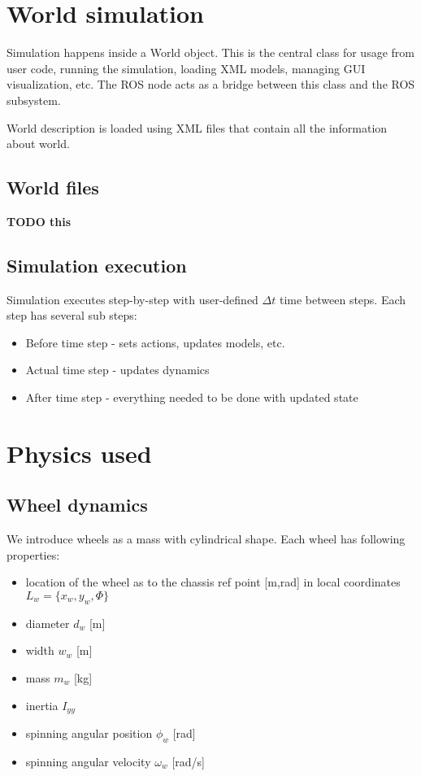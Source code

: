 \documentclass[a4paper,11pt]{article}
\begin{document}
\newpage

\section{World simulation}
Simulation happens inside a World object.
This is the central class for usage from user code, running the simulation, loading XML models, managing GUI visualization, etc.
The ROS node acts as a bridge between this class and the ROS subsystem.

World description is loaded using XML files that contain all the information about world.

\subsection{World files}
\textbf{TODO this}
\newpage


\subsection{Simulation execution}
Simulation executes step-by-step with user-defined $\Delta t$ time between steps.
Each step has several sub steps:
\begin{itemize}
\item Before time step - sets actions, updates models, etc.
\item Actual time step - updates dynamics
\item After time step - everything needed to be done with updated state
\end{itemize}
\newpage

\section{Physics used}
\subsection{Wheel dynamics}

We introduce wheels as a mass with cylindrical shape.
Each wheel has following properties:
\begin{itemize}
\item location of the wheel as to the chassis ref point [m,rad] in local coordinates $L_w = \{ x_w, y_w, \Phi \}$
\item diameter $d_w$ [m]
\item width $w_w$ [m]
\item mass $m_w$ [kg]
\item inertia $I_{yy}$ 
\item spinning angular position $\phi_w$ [rad]
\item spinning angular velocity $\omega_w$ [rad/s]
\end{itemize}
\end{document}
